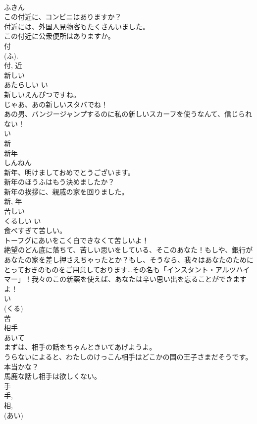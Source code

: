 \documentclass[8pt]{extreport}
\begin{document}
\begin{CJK}{UTF8}{min}
\\	ふきん	
\\	この付近に、コンビニはありますか？	
\\	付近には、外国人見物客もたくさんいました。	
\\	この付近に公衆便所はありますか。	
\\	付 
\\	(ふ). 
\\	付, 近	
\\	新しい	
\\	あたらしい	い 
\\	新しいえんぴつですね。	
\\	じゃあ、あの新しいスタバでね！	
\\	あの男、バンジージャンプするのに私の新しいスカーフを使うなんて、信じられない！	
\\	い 
\\	新	
\\	新年	
\\	しんねん	
\\	新年、明けましておめでとうございます。	
\\	新年のほうふはもう決めましたか？	
\\	新年の挨拶に、親戚の家を回りました。	
\\	新, 年	
\\	苦しい	
\\	くるしい	い 
\\	食べすぎて苦しい。	
\\	トーフグにあいをこく白できなくて苦しいよ！	
\\	絶望のどん底に落ちて、苦しい思いをしている、そこのあなた！もしや、銀行があなたの家を差し押さえちゃったとか？もし、そうなら、我々はあなたのためにとっておきのものをご用意しております…その名も「インスタント・アルツハイマー」！我々のこの新薬を使えば、あなたは辛い思い出を忘ることができますよ！	
\\	い 
\\	(くる) 
\\	苦	
\\	相手	
\\	あいて	
\\	まずは、相手の話をちゃんときいてあげようよ。	
\\	うらないによると、わたしのけっこん相手はどこかの国の王子さまだそうです。本当かな？	
\\	馬鹿な話し相手は欲しくない。	
\\	手 
\\	手, 
\\	相, 
\\	(あい) 

\end{CJK}
\end{document}
